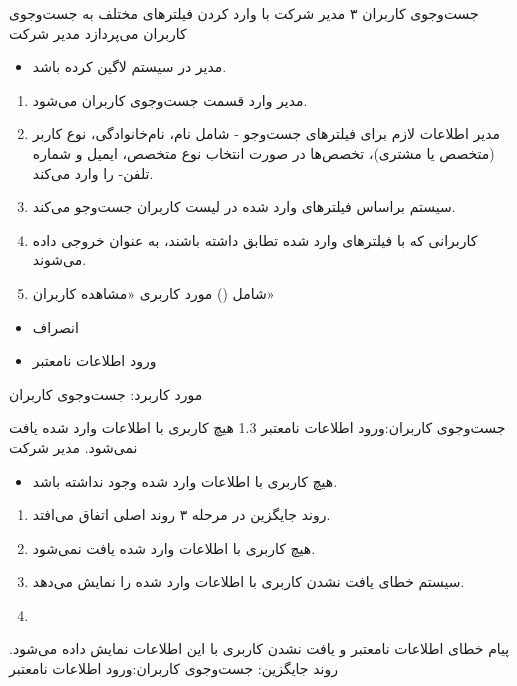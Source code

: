 {
\usecase
{جست‌وجوی کاربران}
{۳}
{مدیر شرکت با وارد کردن فیلترهای مختلف به جست‌و‌جوی کاربران می‌پردازد}
{مدیر شرکت}
{}
{
	\begin{itemize}
	\item
	مدیر در سیستم لاگین کرده باشد.
	
	\end{itemize}
 }
{
\begin{enumerate}
	\item 
	مدیر وارد قسمت جست‌وجوی کاربران می‌شود.
	
	\item 
	مدیر اطلاعات لازم برای فیلتر‌های جست‌وجو - شامل نام،‌ نام‌خانوادگی، نوع کاربر (متخصص یا مشتری)، تخصص‌ها در صورت انتخاب نوع متخصص، ایمیل و شماره تلفن- را وارد می‌کند.
	
	\item
	سیستم براساس فیلتر‌های وارد شده در لیست کاربران جست‌وجو می‌کند.
	
	\item 
	کاربرانی که با فیلتر‌های وارد شده تطابق داشته باشند، به عنوان خروجی داده می‌شوند.
	
	\item
	شامل () مورد کاربری «مشاهده کاربران»
\end{enumerate}
}
{}
{
\begin{itemize}
	\item	
	انصراف
	
	\item 
	ورود اطلاعات نامعتبر
\end{itemize}
}
{مورد کاربرد: جست‌وجوی کاربران}




\alternativeflow
{
	جست‌وجوی کاربران:ورود اطلاعات نامعتبر
}
{1.3}
{
	هیچ کاربری با اطلاعات وارد شده یافت نمی‌شود.
}
{
	مدیر شرکت
}
{}
{
	\begin{itemize}
		
		\item
		هیچ کاربری با اطلاعات وارد شده وجود نداشته باشد.
	\end{itemize}
}
{
	\vspace*{-0.6cm}
	\begin{enumerate}
		\item 
		روند جایگزین در مرحله ۳ روند اصلی اتفاق می‌افتد.
		\item
		هیچ کاربری با اطلاعات وارد شده یافت نمی‌شود.
		\item 
		سیستم خطای یافت نشدن کاربری با اطلاعات وارد شده را نمایش می‌دهد.
		\item
	\end{enumerate}
}
{
	پیام خطای اطلاعات نامعتبر و یافت نشدن کاربری با این اطلاعات نمایش داده می‌شود.
}
{
	روند جایگزین: جست‌وجوی کاربران:ورود اطلاعات نامعتبر
}
}

